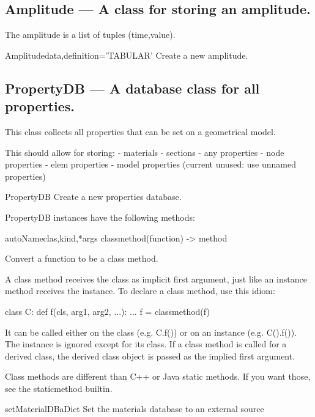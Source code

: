 \subsection{Amplitude --- A class for storing an amplitude.}
    The amplitude is a list of tuples (time,value).
    

\begin{classdesc}{Amplitude}{data,definition='TABULAR'}
Create a new amplitude.
\end{classdesc}

\subsection{PropertyDB --- A database class for all properties.}
    This class collects all properties that can be set on a
    geometrical model.

    This should allow for storing:
       - materials
       - sections
       - any properties
       - node properties
       - elem properties
       - model properties (current unused: use unnamed properties)
    

\begin{classdesc}{PropertyDB}{}
Create a new properties database.
\end{classdesc}

PropertyDB instances have the following methods:

\begin{funcdesc}{autoName}{clas,kind,*args}
classmethod(function) -> method

Convert a function to be a class method.

A class method receives the class as implicit first argument,
just like an instance method receives the instance.
To declare a class method, use this idiom:

  class C:
      def f(cls, arg1, arg2, ...): ...
      f = classmethod(f)

It can be called either on the class (e.g. C.f()) or on an instance
(e.g. C().f()).  The instance is ignored except for its class.
If a class method is called for a derived class, the derived class
object is passed as the implied first argument.

Class methods are different than C++ or Java static methods.
If you want those, see the staticmethod builtin.
\end{funcdesc}

\begin{funcdesc}{setMaterialDB}{aDict}
Set the materials database to an external source
\end{funcdesc}

